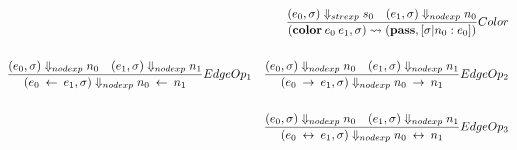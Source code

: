\documentclass{article}
\begin{document}
\begin{align*}
    \frac{(e_0, \sigma) \Downarrow _{strexp} s_0 \quad (e_1, \sigma) \Downarrow _{nodexp} n_0}
         {(\textbf{color} \: e_0 \: e_1, \sigma) \mathrel{\leadsto} (\textbf{pass}, [\sigma | n_0 : e_0])}Color \\~\\
    \frac{(e_0, \sigma) \Downarrow _{nodexp} n_0 \quad (e_1, \sigma) \Downarrow _{nodexp} n_1  }
         {(e_0 \: \leftarrow \: e_1, \sigma) \Downarrow _{nodexp} n_0 \: \leftarrow \: n_1} EdgeOp_1 \quad 
    \frac{(e_0, \sigma) \Downarrow _{nodexp} n_0 \quad (e_1, \sigma) \Downarrow _{nodexp} n_1}
         {(e_0 \: \rightarrow \: e_1, \sigma) \Downarrow _{nodexp} n_0 \: \rightarrow \: n_1} EdgeOp_2 \\~\\
    \frac{(e_0, \sigma) \Downarrow _{nodexp} n_0 \quad (e_1, \sigma) \Downarrow _{nodexp} n_1}
         {(e_0 \: \leftrightarrow \: e_1, \sigma) \Downarrow _{nodexp} n_0 \: \leftrightarrow \: n_1} EdgeOp_3
\end{align*}
\end{document}
